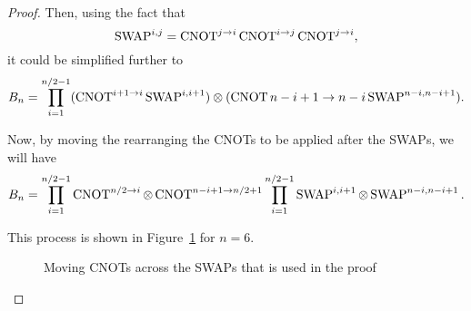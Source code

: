 \begin{proof}
  Then, using the fact that 
  \begin{equation}
    \operatorname{SWAP}^{i,j} = \operatorname{CNOT}^{j \to i} \operatorname{CNOT}^{i \to j} \operatorname{CNOT}^{j \to i},
  \end{equation}
  it could be simplified further to
  \begin{equation}
    B_n = \prod_{i=1}^{n/2 - 1} (\operatorname{CNOT}^{i+1 \to i} \operatorname{SWAP}^{i, i+1}) \otimes (\operatorname{CNOT}{n-i+1\to n-i}\operatorname{SWAP}^{n-i, n-i+1}).
  \end{equation}

  Now, by moving the rearranging the CNOTs to be applied after the SWAPs, we will have
  \begin{equation}
    B_n = \prod_{i=1}^{n/2 - 1} \operatorname{CNOT}^{n/2 \to i} \otimes \operatorname{CNOT}^{n-i+1 \to n/2 + 1} \prod_{i=1}^{n/2 - 1} \operatorname{SWAP}^{i, i+1} \otimes \operatorname{SWAP}^{n-i, n-i+1}.
  \end{equation}

  This process is shown in Figure~\ref{fig:bridged-class-i-proof-b} for $n = 6$.
  
  \begin{figure}[h!]
    \label{fig:bridged-class-i-proof-b}
    \centering
    \caption{Moving CNOTs across the SWAPs that is used in the proof}
  \end{figure}


\end{proof}
